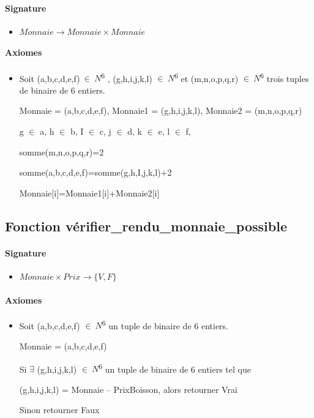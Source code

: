 \documentclass[]{article}
\begin{document}
\paragraph{Signature}
\begin{itemize}
\item
  $Monnaie \longrightarrow  Monnaie \times Monnaie$
\end{itemize}
\paragraph{Axiomes}
\begin{itemize}
\item
 Soit (a,b,c,d,e,f)\(\  \in \ N\)\textsuperscript{6} ,
  (g,h,i,j,k,l) \(\in \ N\)\textsuperscript{6} et (m,n,o,p,q,r)
  \(\in \ N\)\textsuperscript{6} trois tuples de binaire de 6 entiers.

Monnaie = (a,b,c,d,e,f), Monnaie1 = (g,h,i,j,k,l), Monnaie2 =
(m,n,o,p,q,r)

g \(\in \) a, h \(\in \) b, I \(\in \) c, j \(\in \) d, k \(\in \) e, l \(\in \) f,

somme(m,n,o,p,q,r)=2

somme(a,b,c,d,e,f)=somme(g,h,I,j,k,l)+2

Monnaie{[}i{]}=Monnaie1{[}i{]}+Monnaie2{[}i{]}
\end{itemize}

\subsection*{Fonction vérifier\_rendu\_monnaie\_possible}
\paragraph{Signature}
\begin{itemize}
\item
  $Monnaie \times Prix \longrightarrow  \{V, F\}$
\end{itemize}
\paragraph{Axiomes}
\begin{itemize}
\item
Soit (a,b,c,d,e,f) \(\in \ N\)\textsuperscript{6} un tuple de
  binaire de 6 entiers.

Monnaie = (a,b,c,d,e,f)

Si \(\exists \) (g,h,i,j,k,l) \(\in \ N\)\textsuperscript{6} un tuple de binaire de
6 entiers tel que

(g,h,i,j,k,l) = Monnaie -- PrixBoisson, alors retourner Vrai

Sinon retourner Faux
\end{itemize}
\end{document}
